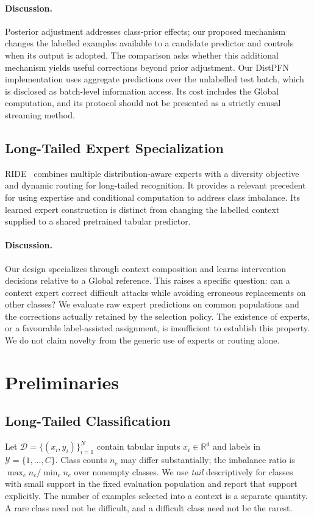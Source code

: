 \documentclass[sigconf,anonymous,pbalance]{acmart}
\begin{document}
\paragraph{Discussion.}
Posterior adjustment addresses class-prior effects; our proposed mechanism changes the labelled examples available to a candidate predictor and controls when its output is adopted. The comparison asks whether this additional mechanism yields useful corrections beyond prior adjustment. Our DistPFN implementation uses aggregate predictions over the unlabelled test batch, which is disclosed as batch-level information access. Its cost includes the Global computation, and its protocol should not be presented as a strictly causal streaming method.

\subsection{Long-Tailed Expert Specialization}
RIDE~\cite{wang2020long} combines multiple distribution-aware experts with a diversity objective and dynamic routing for long-tailed recognition. It provides a relevant precedent for using expertise and conditional computation to address class imbalance. Its learned expert construction is distinct from changing the labelled context supplied to a shared pretrained tabular predictor.

\paragraph{Discussion.}
Our design specializes through context composition and learns intervention decisions relative to a Global reference. This raises a specific question: can a context expert correct difficult attacks while avoiding erroneous replacements on other classes? We evaluate raw expert predictions on common populations and the corrections actually retained by the selection policy. The existence of experts, or a favourable label-assisted assignment, is insufficient to establish this property. We do not claim novelty from the generic use of experts or routing alone.

\section{Preliminaries}
\label{sec:prelim}
\subsection{Long-Tailed Classification}
Let $\mathcal{D}=\{(x_i,y_i)\}_{i=1}^{N}$ contain tabular inputs $x_i\in\mathbb{R}^{d}$ and labels in $\mathcal{Y}=\{1,\ldots,C\}$. Class counts $n_c$ may differ substantially; the imbalance ratio is $\max_c n_c/\min_c n_c$ over nonempty classes. We use \emph{tail} descriptively for classes with small support in the fixed evaluation population and report that support explicitly. The number of examples selected into a context is a separate quantity. A rare class need not be difficult, and a difficult class need not be the rarest.
\end{document}

